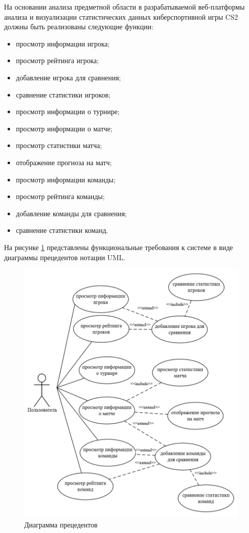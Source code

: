 На основании анализа предметной области в разрабатываемой веб-платформы анализа и визуализации статистических данных киберспортивной игры CS2 должны быть реализованы следующие функции:
\begin{itemize}
	\item просмотр информации игрока;
	\item просмотр рейтинга игрока;
	\item добавление игрока для сравнения;
	\item сравнение статистики игроков;
	\item просмотр информации о турнире;
	\item просмотр информации о матче;
	\item просмотр статистики матча;
	\item отображение прогноза на матч;
	\item просмотр информации команды;
	\item просмотр рейтинга команды;
	\item добавление команды для сравнения;
	\item сравнение статистики команд.
\end{itemize}

На рисунке \ref{fig:-use_case_diagram} представлены функциональные требования к системе в виде диаграммы прецедентов нотации UML.
\begin{figure}
	\centering
	\includegraphics[width=0.7\linewidth]{"images/Диаграмма прецедентов"}
	\caption{Диаграмма прецедентов}
	\label{fig:-use_case_diagram}
\end{figure}

